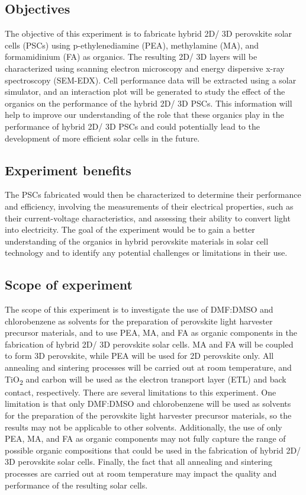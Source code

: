 \subsection{Objectives}
The objective of this experiment is to fabricate hybrid 2D/ 3D perovskite solar cells (PSCs) using p-ethylenediamine (PEA), methylamine (MA), and formamidinium (FA) as organics. The resulting 2D/ 3D layers will be characterized using scanning electron microscopy and energy dispersive x-ray spectroscopy (SEM-EDX). Cell performance data will be extracted using a solar simulator, and an interaction plot will be generated to study the effect of the organics on the performance of the hybrid 2D/ 3D PSCs. This information will help to improve our understanding of the role that these organics play in the performance of hybrid 2D/ 3D PSCs and could potentially lead to the development of more efficient solar cells in the future.
\subsection{Experiment benefits}
The PSCs fabricated would then be characterized to determine their performance and efficiency, involving the measurements of their electrical properties, such as their current-voltage characteristics, and assessing their ability to convert light into electricity. The goal of the experiment would be to gain a better understanding of the organics in hybrid perovskite materials in solar cell technology and to identify any potential challenges or limitations in their use.
\subsection{Scope of experiment}
The scope of this experiment is to investigate the use of DMF:DMSO and chlorobenzene as solvents for the preparation of perovskite light harvester precursor materials, and to use PEA, MA, and FA as organic components in the fabrication of hybrid 2D/ 3D perovskite solar cells. MA and FA will be coupled to form 3D perovskite, while PEA will be used for 2D perovskite only. All annealing and sintering processes will be carried out at room temperature, and TiO\textsubscript{2} and carbon will be used as the electron transport layer (ETL) and back contact, respectively. There are several limitations to this experiment. One limitation is that only DMF:DMSO and chlorobenzene will be used as solvents for the preparation of the perovskite light harvester precursor materials, so the results may not be applicable to other solvents. Additionally, the use of only PEA, MA, and FA as organic components may not fully capture the range of possible organic compositions that could be used in the fabrication of hybrid 2D/ 3D perovskite solar cells. Finally, the fact that all annealing and sintering processes are carried out at room temperature may impact the quality and performance of the resulting solar cells.